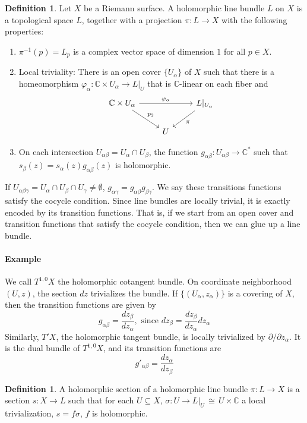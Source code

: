 \documentclass[12pt]{article}
\theoremstyle{plain}
\theoremstyle{definition}
\newtheorem{definition}[equation]{Definition}
\newcommand{\IC}{\mathbb{C}}
\newcommand\iso{{\, \cong \,}}
\newcommand{\<}{\langle}
\renewcommand{\>}{\rangle}
\newcommand{\p}{\partial}
\begin{document}
\begin{definition}
Let $X$ be a Riemann surface. A holomorphic line bundle $L$ on $X$ is a topological space $L$, together with a projection $\pi : L \to X$ with the following properties: 
\begin{enumerate}
\item $\pi^{-1}(p) = L_p$ is a complex vector space of dimension $1$ for all $p \in X$. 
\item Local triviality: There is an open cover $\{ U_\alpha\}$ of $X$ such that there is a homeomorphism $\varphi_\alpha : \IC \times U_\alpha \to L|_U$ that is $\IC$-linear on each fiber and 
\[
\begin{tikzcd}
\IC \times U_\alpha \arrow{dr}{p_2} \arrow{rr}{\varphi_\alpha} && L|_{U_\alpha} \arrow{dl}{\pi} \\
{} & U 
\end{tikzcd}
\]
\item On each intersection $U_{\alpha \beta} = U_\alpha \cap U_\beta$, the function $g_{\alpha \beta} : U_{\alpha \beta} \to \IC^*$ such that 
$s_\beta(z) = s_\alpha(z) g_{\alpha \beta}(z)$ is holomorphic. 
\end{enumerate}
\end{definition}

If $U_{\alpha \beta \gamma} = U_\alpha \cap U_\beta \cap U_\gamma \neq \emptyset$, $g_{\alpha \gamma} = g_{\alpha \beta} g_{\beta \gamma}$. We say these transitions functions satisfy the cocycle condition. Since line bundles are locally trivial, it is exactly encoded by its transition functions. That is, if we start from an open cover and transition functions that satisfy the cocycle condition, then we can glue up a line bundle.  

\paragraph{Example} We call $T^{1, 0} X$ the holomorphic cotangent bundle. On coordinate neighborhood $(U, z)$, the section $dz$ trivializes the bundle. If $\{ (U_\alpha, z_\alpha) \}$ is a covering of $X$, then the transition functions are given by 
$$ g_{\alpha \beta} = \frac{d z_\beta}{d z_\alpha}, \text{ since } dz_\beta = \frac{d z_\beta}{d z_\alpha} d z_\alpha $$
Similarly, $T'X$, the holomorphic tangent bundle, is locally trivialized by $\p/\p z_\alpha$. It is the dual bundle of $T^{1, 0} X$, and its transition functions are 
$$ g'_{\alpha \beta} = \frac{d z_\alpha}{d z_\beta} $$

\begin{definition}
A holomorphic section of a holomorphic line bundle $\pi : L \to X$ is a section $s : X \to L$ such that for each $U \subseteq X$, $\sigma : U \to L|_U \iso U \times \IC$ a local trivialization, $s = f \sigma$, $f$ is holomorphic. 
\end{definition}
\end{document}
